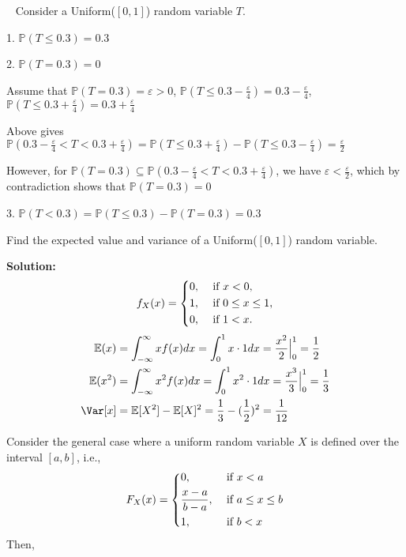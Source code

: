 \begin{eg}~ 
    Consider a Uniform(\([0, 1]\)) random variable \(T\). 

    1. \(\mathbb{P}(T \leq 0.3) = 0.3\) 

    2. \(\mathbb{P}(T = 0.3) = 0\)
        
    Assume that \(\mathbb{P}(T = 0.3) = \varepsilon > 0\), \(\mathbb{P}(T \leq 0.3 - \frac{\varepsilon}{4}) = 0.3 - \frac{\varepsilon}{4}\), \(\mathbb{P}(T \leq 0.3 + \frac{\varepsilon}{4}) = 0.3 + \frac{\varepsilon}{4}\)

    Above gives \(\mathbb{P}(0.3 - \frac{\varepsilon}{4} < T < 0.3 + \frac{\varepsilon}{4}) = \mathbb{P}(T \leq 0.3 + \frac{\varepsilon}{4}) - \mathbb{P}(T \leq 0.3 - \frac{\varepsilon}{4}) = \frac{\varepsilon}{2}\) 

    However, for \(\mathbb{P}(T = 0.3) \subseteq \mathbb{P}(0.3 - \frac{\varepsilon}{4} < T < 0.3 + \frac{\varepsilon}{4})\), we have \(\varepsilon < \frac{\varepsilon}{2}\), which by contradiction shows that \(\mathbb{P}(T = 0.3) = 0\)

    3. \(\mathbb{P}(T < 0.3) = \mathbb{P}(T \leq 0.3) - \mathbb{P}(T = 0.3) = 0.3\)
\end{eg}

\begin{eg}
    Find the expected value and variance of a Uniform(\([0, 1]\)) random variable.

    \textbf{Solution:} 
    \[
        f_X(x) = \begin{dcases}
            0, &\text{ if } x < 0 ,\\
            1, &\text{ if } 0 \leq x \leq 1 ,\\
            0, &\text{ if } 1 < x.
        \end{dcases}
    \]
    \[
    \begin{aligned}
        \mathbb{E}(x) &= \int_{-\infty} ^{\infty} xf(x)dx = \int_{0}^{1} x \cdot 1 dx = \dfrac{x^2}{2} \Big|_0^1 = \frac{1}{2} \\
        \mathbb{E}(x^2) &= \int_{-\infty} ^{\infty} x^2f(x)dx = \int_{0}^{1} x^2 \cdot 1 dx = \dfrac{x^3}{3} \Big|_0^1 = \frac{1}{3} \\
        \Var[x] &= \mathbb{E}[X^2] - \mathbb{E}[X]^2 = \dfrac{1}{3} - (\dfrac{1}{2})^2 = \dfrac{1}{12}
    \end{aligned}
    \]
\end{eg}

Consider the general case where a uniform random variable \(X\) is defined over the interval \([a, b]\), i.e.,
\[
    F_X(x) = \begin{dcases}
        0, &\text{ if } x < a \\
        \frac{x - a}{b - a}, &\text{ if } a \leq x \leq b \\
        1 , &\text{ if } b < x
    \end{dcases}
\]
Then,

